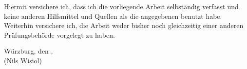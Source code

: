 \newpage

\vspace*{3cm}

Hiermit versichere ich, dass ich die vorliegende Arbeit selbständig verfasst und keine anderen Hilfsmittel und Quellen als die angegebenen benutzt habe. Weiterhin versichere ich, die Arbeit weder bisher noch gleichzeitig einer anderen Prüfungsbehörde vorgelegt zu haben.

\vspace{1.5cm}

Würzburg, den \underline{\hspace{3.5cm}}, \hspace*{0.5cm} \underline{\hspace{6.0cm}}\\
\hspace*{8.7cm}(Nils Wisiol)